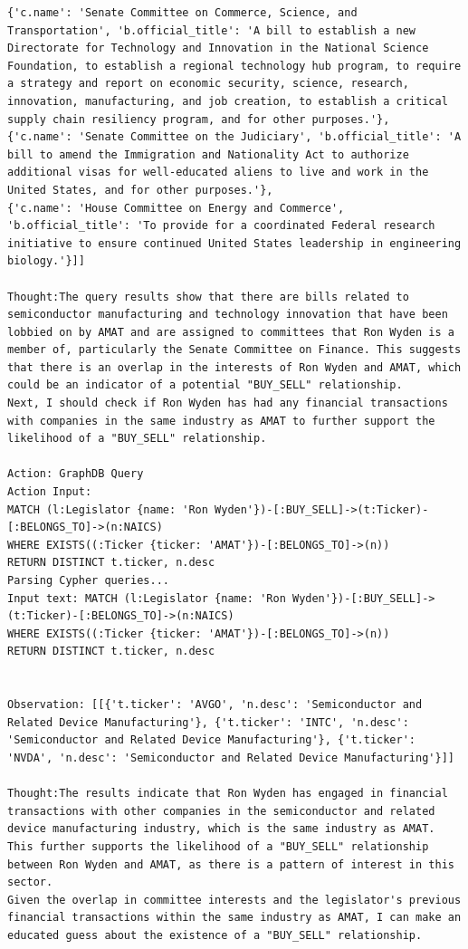 \documentclass[15pt,letterpaper]{article}
\begin{document}
\begin{Verbatim}[breaklines=true, frame=single]
{'c.name': 'Senate Committee on Commerce, Science, and Transportation', 'b.official_title': 'A bill to establish a new Directorate for Technology and Innovation in the National Science Foundation, to establish a regional technology hub program, to require a strategy and report on economic security, science, research, innovation, manufacturing, and job creation, to establish a critical supply chain resiliency program, and for other purposes.'}, 
{'c.name': 'Senate Committee on the Judiciary', 'b.official_title': 'A bill to amend the Immigration and Nationality Act to authorize additional visas for well-educated aliens to live and work in the United States, and for other purposes.'}, 
{'c.name': 'House Committee on Energy and Commerce', 'b.official_title': 'To provide for a coordinated Federal research initiative to ensure continued United States leadership in engineering biology.'}]]

Thought:The query results show that there are bills related to semiconductor manufacturing and technology innovation that have been lobbied on by AMAT and are assigned to committees that Ron Wyden is a member of, particularly the Senate Committee on Finance. This suggests that there is an overlap in the interests of Ron Wyden and AMAT, which could be an indicator of a potential "BUY_SELL" relationship. 
Next, I should check if Ron Wyden has had any financial transactions with companies in the same industry as AMAT to further support the likelihood of a "BUY_SELL" relationship.

Action: GraphDB Query
Action Input: 
MATCH (l:Legislator {name: 'Ron Wyden'})-[:BUY_SELL]->(t:Ticker)-[:BELONGS_TO]->(n:NAICS)
WHERE EXISTS((:Ticker {ticker: 'AMAT'})-[:BELONGS_TO]->(n))
RETURN DISTINCT t.ticker, n.desc
Parsing Cypher queries...
Input text: MATCH (l:Legislator {name: 'Ron Wyden'})-[:BUY_SELL]->(t:Ticker)-[:BELONGS_TO]->(n:NAICS)
WHERE EXISTS((:Ticker {ticker: 'AMAT'})-[:BELONGS_TO]->(n))
RETURN DISTINCT t.ticker, n.desc


Observation: [[{'t.ticker': 'AVGO', 'n.desc': 'Semiconductor and Related Device Manufacturing'}, {'t.ticker': 'INTC', 'n.desc': 'Semiconductor and Related Device Manufacturing'}, {'t.ticker': 'NVDA', 'n.desc': 'Semiconductor and Related Device Manufacturing'}]]

Thought:The results indicate that Ron Wyden has engaged in financial transactions with other companies in the semiconductor and related device manufacturing industry, which is the same industry as AMAT. This further supports the likelihood of a "BUY_SELL" relationship between Ron Wyden and AMAT, as there is a pattern of interest in this sector.
Given the overlap in committee interests and the legislator's previous financial transactions within the same industry as AMAT, I can make an educated guess about the existence of a "BUY_SELL" relationship.


\end{Verbatim}
\end{document}
